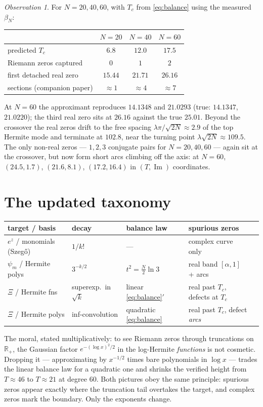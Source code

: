 \documentclass[11pt]{article}
\theoremstyle{remark}
\newtheorem{observation}[theorem]{Observation}
\newcommand{\R}{\mathbb{R}}
\begin{document}
\begin{observation}
For $N = 20, 40, 60$, with $T_c$ from \eqref{eq:balance} using the measured $\beta_N$:
\begin{center}
\begin{tabular}{@{}lccc@{}}
\toprule
 & $N=20$ & $N=40$ & $N=60$ \\
\midrule
predicted $T_c$ & $6.8$ & $12.0$ & $17.5$ \\
Riemann zeros captured & $0$ & $1$ & $2$ \\
first detached real zero & $15.44$ & $21.71$ & $26.16$ \\
sections (companion paper) & $\approx 1$ & $\approx 4$ & $\approx 7$ \\
\bottomrule
\end{tabular}
\end{center}
At $N = 60$ the approximant reproduces $14.1348$ and $21.0293$ (true: $14.1347$, $21.0220$); the third real zero sits at $26.16$ against the true $25.01$. Beyond the crossover the real zeros drift to the free spacing $\lambda\pi/\sqrt{2N} \approx 2.9$ of the top Hermite mode and terminate at $102.8$, near the turning point $\lambda\sqrt{2N} \approx 109.5$. The only non-real zeros --- $1, 2, 3$ conjugate pairs for $N = 20, 40, 60$ --- again sit at the crossover, but now form short arcs climbing off the axis: at $N = 60$, $(24.5, 1.7)$, $(21.6, 8.1)$, $(17.2, 16.4)$ in $(T, \operatorname{Im})$ coordinates.
\end{observation}

\section{The updated taxonomy}

\begin{center}
\begin{tabular}{@{}lllll@{}}
\toprule
target / basis & decay & balance law & spurious zeros \\
\midrule
$e^z$ / monomials (Szeg\H{o}) & $1/k!$ & --- & complex curve only \\
$\psi_m$ / Hermite polys & $3^{-k/2}$ & $t^2 = \tfrac{N}{2}\ln 3$ & real band $[\alpha,1]$ + arcs \\
$\Xi$ / Hermite fns & superexp.\ in $\sqrt{k}$ & linear \eqref{eq:balance}$'$ & real past $T_c$, defects at $T_c$ \\
$\Xi$ / Hermite polys & inf-convolution & quadratic \eqref{eq:balance} & real past $T_c$, defect \emph{arcs} \\
\bottomrule
\end{tabular}
\end{center}

The moral, stated multiplicatively: to see Riemann zeros through truncations on $\R_+$, the Gaussian factor $e^{-(\log x)^2/2}$ in the log-Hermite \emph{functions} is not cosmetic. Dropping it --- approximating by $x^{-1/2}$ times bare polynomials in $\log x$ --- trades the linear balance law for a quadratic one and shrinks the verified height from $T \approx 46$ to $T \approx 21$ at degree $60$. Both pictures obey the same principle: spurious zeros appear exactly where the truncation tail overtakes the target, and complex zeros mark the boundary. Only the exponents change.
\end{document}
